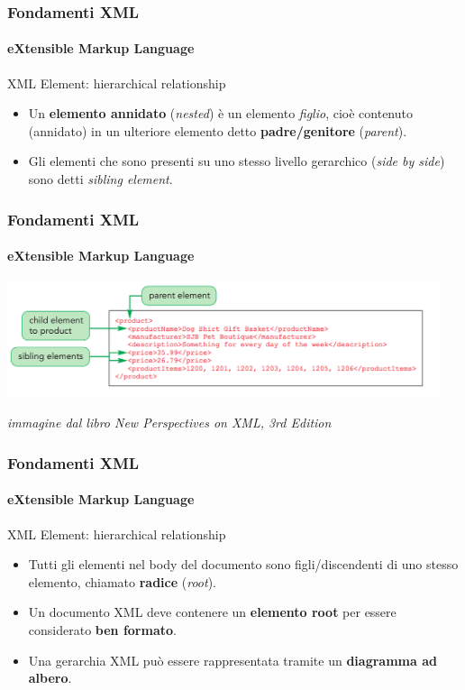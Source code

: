 \begin{frame}
    \frametitle{Fondamenti XML}
    \framesubtitle{eXtensible Markup Language}
    \addtocounter{nframe}{1}

	\begin{block}{XML Element: hierarchical relationship}
		\begin{itemize}
			\item Un \textbf{elemento annidato} (\textit{nested}) è un elemento \textit{figlio}, cioè contenuto (annidato) in un ulteriore elemento detto \textbf{padre/genitore} (\textit{parent}).
			\item Gli elementi che sono presenti su uno stesso livello gerarchico (\textit{side by side}) sono detti \textit{sibling element}.
		\end{itemize}
	\end{block}

\end{frame}

\begin{frame}
	\frametitle{Fondamenti XML}
	\framesubtitle{eXtensible Markup Language}
	\addtocounter{nframe}{1}

	\begin{center}
		\includegraphics[width=0.95\textwidth]{imgs/XML-Parent-Child-Sibling.png}
    \end{center}
\begin{tiny}\textit{immagine dal libro New Perspectives on XML, 3rd Edition}\end{tiny}

\end{frame}

\begin{frame}
    \frametitle{Fondamenti XML}
    \framesubtitle{eXtensible Markup Language}
    \addtocounter{nframe}{1}

	\begin{block}{XML Element: hierarchical relationship}
		\begin{itemize}
			\item Tutti gli elementi nel body del documento sono figli/discendenti di uno stesso elemento, chiamato \textbf{radice} (\textit{root}).
			\item Un documento XML deve contenere un \textbf{elemento root} per essere considerato \textbf{ben formato}.
			\item Una gerarchia XML può essere rappresentata tramite un \textbf{diagramma ad albero}.
		\end{itemize}
	\end{block}

\end{frame}


